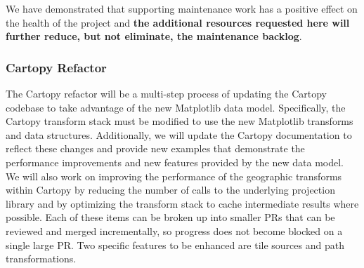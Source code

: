 \documentclass[12pt]{article}
\numberwithin{page}{section}
\begin{document}


We have demonstrated that supporting maintenance work has a positive effect on
the health of the project and \textbf{the additional resources requested here
  will further reduce, but not eliminate, the maintenance backlog}.



\subsubsection{Cartopy Refactor}

The Cartopy refactor will be a multi-step process of updating the
Cartopy codebase to take advantage of the new Matplotlib data model.
Specifically, the Cartopy transform stack must be modified to use the new Matplotlib transforms
and data structures. Additionally, we will update the Cartopy documentation to
reflect these changes and provide new examples that demonstrate the performance
improvements and new features provided by the new data model. We will
also work on improving the performance of the geographic transforms within Cartopy
by reducing the number of calls to the underlying projection library and by optimizing
the transform stack to cache intermediate results where possible. Each of these items
can be broken up into smaller PRs that can be reviewed and merged
incrementally, so progress does not become blocked on a single
large PR. Two specific features to be enhanced are tile sources and path transformations.
\end{document}
